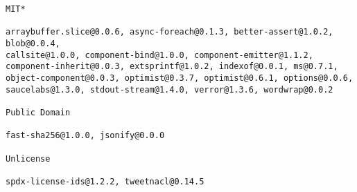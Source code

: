 \documentclass[a4paper]{article}
\begin{document}
\begin{verbatim}
MIT*

arraybuffer.slice@0.0.6, async-foreach@0.1.3, better-assert@1.0.2, blob@0.0.4,
callsite@1.0.0, component-bind@1.0.0, component-emitter@1.1.2,
component-inherit@0.0.3, extsprintf@1.0.2, indexof@0.0.1, ms@0.7.1,
object-component@0.0.3, optimist@0.3.7, optimist@0.6.1, options@0.0.6,
saucelabs@1.3.0, stdout-stream@1.4.0, verror@1.3.6, wordwrap@0.0.2

Public Domain

fast-sha256@1.0.0, jsonify@0.0.0

Unlicense

spdx-license-ids@1.2.2, tweetnacl@0.14.5

\end{verbatim}
\end{document}
